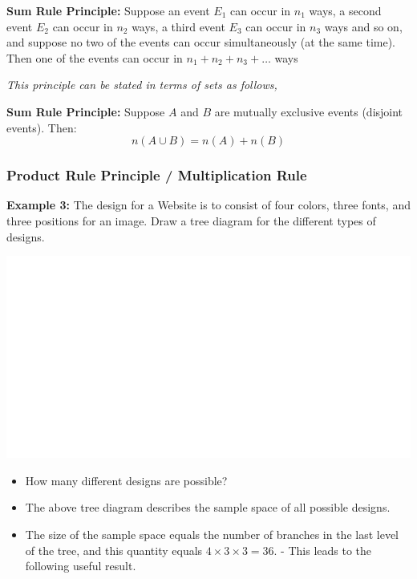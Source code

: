 \documentclass[]{book}
\begin{document}
\textbf{Sum Rule Principle:} Suppose an event \(E_1\) can occur in \(n_1\) ways, a second event \(E_2\) can occur in \(n_2\) ways, a third event \(E_3\) can occur in \(n_3\) ways and so on, and suppose no two of the events can occur simultaneously (at the same time). Then one of the events can occur in \(n_1 + n_2 + n_3 + \dots\) ways

\emph{This principle can be stated in terms of sets as follows,}

\textbf{Sum Rule Principle:} Suppose \(A\) and \(B\) are mutually exclusive events (disjoint events). Then: \[n(A \cup B)   = n(A) + n(B)\]

\hypertarget{product-rule-principle-multiplication-rule}{%
\subsubsection{Product Rule Principle / Multiplication Rule}\label{product-rule-principle-multiplication-rule}}

\textbf{Example 3:} The design for a Website is to consist of four colors, three fonts, and three positions for an image. Draw a tree diagram for the different types of designs.

\begin{center}\includegraphics[width=1\linewidth]{figure/box83-1} \end{center}

\begin{itemize}
\item
  How many different designs are possible?
\item
  The above tree diagram describes the sample space of all possible designs.
\item
  The size of the sample space equals the number of branches in the last level of the tree, and this quantity equals \(4 \times 3 \times 3 = 36\). - This leads to the following useful result.
\end{itemize}
\end{document}
